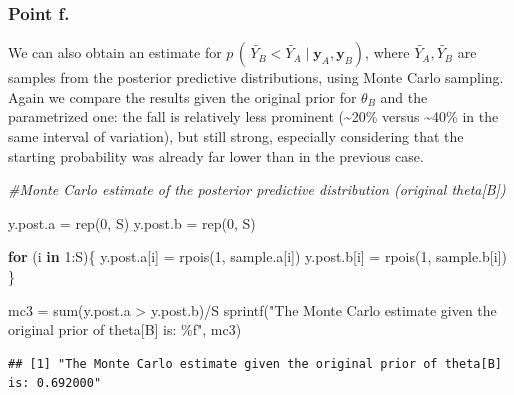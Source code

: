 \documentclass[
  11pt,
]{article}
\newenvironment{Shaded}{\begin{snugshade}}{\end{snugshade}}
\newcommand{\CommentTok}[1]{\textcolor[rgb]{0.56,0.35,0.01}{\textit{#1}}}
\newcommand{\ControlFlowTok}[1]{\textcolor[rgb]{0.13,0.29,0.53}{\textbf{#1}}}
\newcommand{\DecValTok}[1]{\textcolor[rgb]{0.00,0.00,0.81}{#1}}
\newcommand{\FunctionTok}[1]{\textcolor[rgb]{0.00,0.00,0.00}{#1}}
\newcommand{\NormalTok}[1]{#1}
\newcommand{\OtherTok}[1]{\textcolor[rgb]{0.56,0.35,0.01}{#1}}
\newcommand{\SpecialCharTok}[1]{\textcolor[rgb]{0.00,0.00,0.00}{#1}}
\newcommand{\StringTok}[1]{\textcolor[rgb]{0.31,0.60,0.02}{#1}}
\begin{document}
\hypertarget{point-f.}{%
\subsubsection{Point f.}\label{point-f.}}

We can also obtain an estimate for
\(p \,( \, \tilde{Y_B} < \tilde{Y_A} \; | \; \mathbf{y}_A, \mathbf{y}_B)\),
where \(\tilde{Y_A}, \tilde{Y_B}\) are samples from the posterior
predictive distributions, using Monte Carlo sampling. Again we compare
the results given the original prior for \(\theta_B\) and the
parametrized one: the fall is relatively less prominent (\sim 20\%
versus \sim 40\% in the same interval of variation), but still strong,
especially considering that the starting probability was already far
lower than in the previous case.

\scriptsize

\begin{Shaded}
\begin{Highlighting}[]
\CommentTok{\#Monte Carlo estimate of the posterior predictive distribution (original theta[B])}

\NormalTok{y.post.a }\OtherTok{=} \FunctionTok{rep}\NormalTok{(}\DecValTok{0}\NormalTok{, S)}
\NormalTok{y.post.b }\OtherTok{=} \FunctionTok{rep}\NormalTok{(}\DecValTok{0}\NormalTok{, S)}

\ControlFlowTok{for}\NormalTok{ (i }\ControlFlowTok{in} \DecValTok{1}\SpecialCharTok{:}\NormalTok{S)\{}
\NormalTok{  y.post.a[i] }\OtherTok{=} \FunctionTok{rpois}\NormalTok{(}\DecValTok{1}\NormalTok{, sample.a[i])}
\NormalTok{  y.post.b[i] }\OtherTok{=} \FunctionTok{rpois}\NormalTok{(}\DecValTok{1}\NormalTok{, sample.b[i])}
\NormalTok{\}}

\NormalTok{mc3 }\OtherTok{=} \FunctionTok{sum}\NormalTok{(y.post.a }\SpecialCharTok{\textgreater{}}\NormalTok{ y.post.b)}\SpecialCharTok{/}\NormalTok{S}
\FunctionTok{sprintf}\NormalTok{(}\StringTok{"The Monte Carlo estimate given the original prior of theta[B] is: \%f"}\NormalTok{, mc3)}
\end{Highlighting}
\end{Shaded}

\begin{verbatim}
## [1] "The Monte Carlo estimate given the original prior of theta[B] is: 0.692000"
\end{verbatim}
\end{document}
